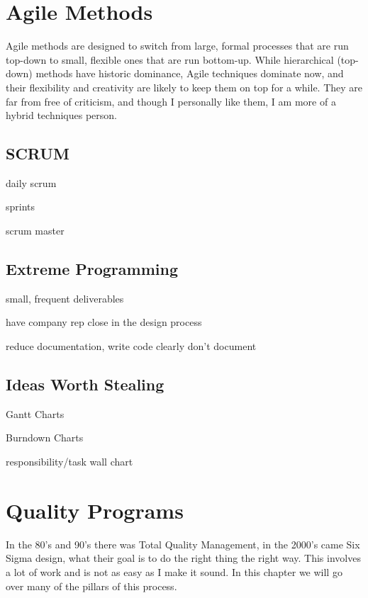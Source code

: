 \section{Agile Methods}
Agile methods are designed to switch from large, formal processes that are run top-down to small, flexible ones that are run bottom-up.  While hierarchical (top-down) methods have historic dominance, Agile techniques dominate now, and their flexibility and creativity are likely to keep them on top for a while.  They are far from free of criticism, and though I personally like them, I am more of a hybrid techniques person.

\subsection{SCRUM}

daily scrum

sprints

scrum master

\subsection{Extreme Programming}

small, frequent deliverables

have company rep close in the design process

reduce documentation, write code clearly don't document

\subsection{Ideas Worth Stealing}

Gantt Charts

Burndown Charts

responsibility/task wall chart


\section{Quality Programs}

In the 80's and 90's there was Total Quality Management, in the 2000's came Six Sigma design, what their goal is to do the right thing the right way.  This involves a lot of work and is not as easy as I make it sound.  In this chapter we will go over many of the pillars of this process.

